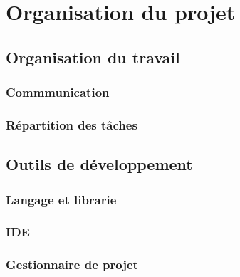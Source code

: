 \chapter{Organisation du projet}

\section{Organisation du travail}
        
        \subsection{Commmunication}
        
        \subsection{Répartition des tâches}

\section{Outils de développement}

        \subsection{Langage et librarie}

        \subsection{IDE}

        \subsection{Gestionnaire de projet}



